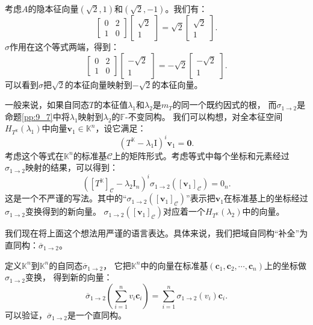 \documentclass[12pt,UTF8]{ctexbook}
\begin{document}
考虑$A$的隐本征向量$(\sqrt{2}, 1)$和$(\sqrt{2}, -1)$。我们有：
$$ \begin{bmatrix} 0 & 2 \\ 1 & 0 \end{bmatrix} \begin{bmatrix} \sqrt{2} \\ 1 \end{bmatrix} = \sqrt{2} \begin{bmatrix} \sqrt{2} \\ 1 \end{bmatrix}.$$
$\sigma$作用在这个等式两端，得到：
$$ \begin{bmatrix} 0 & 2 \\ 1 & 0 \end{bmatrix} \begin{bmatrix} -\sqrt{2} \\ 1 \end{bmatrix} = -\sqrt{2} \begin{bmatrix} -\sqrt{2} \\ 1 \end{bmatrix}.$$
可以看到$\sigma$把$\sqrt{2}$的本征向量映射到$-\sqrt{2}$的本征向量。

一般来说，如果自同态$T$的本征值$\lambda_1$和$\lambda_2$是$m_T$的同一个既约因式的根，
而$\sigma_{1\rightarrow 2}$是命题\ref{pp:9_7}中将$\lambda_1$映射到$\lambda_2$的$\mathbb{F}$-不变同构。
我们可以构想，对全本征空间$H_{T^{\mathbb{K}}}(\lambda_1)$中向量$\mathbf{v}_1 \in \mathbb{K}^n$，设它满足：
$$ (T^{\mathbb{K}} - \lambda_1\mathrm{I})^i \mathbf{v}_1 = \mathbf{0}. $$
考虑这个等式在$\mathbb{K}^n$的标准基$\mathcal{C}$上的矩阵形式。考虑等式中每个坐标和元素经过$\sigma_{1\rightarrow 2}$映射的结果，可以得到：
$$ ([T^{\mathbb{K}}]_\mathcal{C} - \lambda_2\mathrm{I}_n)^i \sigma_{1\rightarrow 2}([\mathbf{v}_1]_\mathcal{C}) = \mathrm{0}_n. $$
这是一个不严谨的写法。其中的“$\sigma_{1\rightarrow 2}([\mathbf{v}_1]_\mathcal{C})$”表示把$\mathbf{v}_1$在标准基上的坐标经过$\sigma_{1\rightarrow 2}$变换得到的新向量。
$\sigma_{1\rightarrow 2}([\mathbf{v}_1]_\mathcal{C})$对应着一个$H_{T^{\mathbb{K}}}(\lambda_2)$中的向量。

我们现在将上面这个想法用严谨的语言表达。具体来说，我们把域自同构“补全”为直同构：$\overline{\sigma}_{1\rightarrow 2}$。

定义$\mathbb{K}^n$到$\mathbb{K}^n$的自同态$\overline{\sigma}_{1\rightarrow 2}$，
它把$\mathbb{K}^n$中的向量在标准基$(\mathbf{c}_1, \mathbf{c}_2, \cdots , \mathbf{c}_n)$上的坐标做$\sigma_{1\rightarrow 2}$变换，
得到新的向量：
$$ \overline{\sigma}_{1\rightarrow 2} \left(\sum_{i=1}^n v_i \mathbf{c}_i\right) = \sum_{i=1}^n \sigma_{1\rightarrow 2} \left( v_i\right) \mathbf{c}_i.$$
可以验证，$\overline{\sigma}_{1\rightarrow 2}$是一个直同构。
\end{document}
